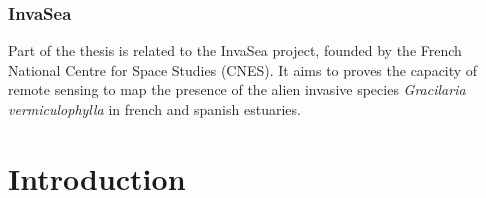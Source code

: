 \documentclass[
  letterpaper,
  11pt,
  english,
  singlespacing,
  headsepline]{MastersDoctoralThesis}
\newcommand{\chaptertopimage}{Chapter1/img/seagrasses.png}
\newcommand{\chapterbottomimage}{Chapter1/img/seagrasses.png}
\begin{document}
\subsection*{InvaSea}\label{invasea}

Part of the thesis is related to the InvaSea project, founded by the
French National Centre for Space Studies (CNES). It aims to proves the
capacity of remote sensing to map the presence of the alien invasive
species \emph{Gracilaria vermiculophylla} in french and spanish
estuaries.

\renewcommand{\chaptertopimage}{Chapter1/img/seagrasses.png}
\renewcommand{\chapterbottomimage}{Chapter1/img/fish_farm_psd.png}

\newpage\null\thispagestyle{empty}\newpage


\chapter{Introduction}\label{introduction}
\end{document}
